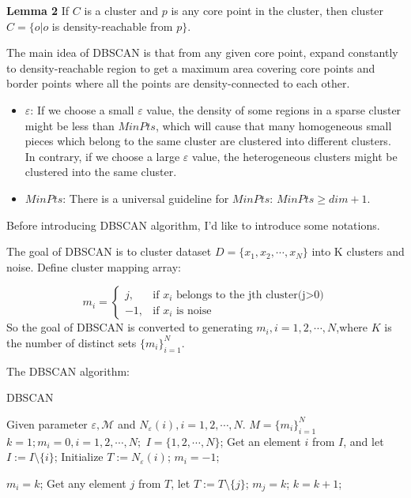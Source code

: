 \documentclass{article}
\begin{document}
\noindent\textbf{Lemma 2} If $C$ is a cluster and $p$ is any core point in the cluster, then cluster $C=\{o|o $ is density-reachable from $p \}$.


The main idea of DBSCAN is that from any given core point, expand constantly to density-reachable region to get a maximum area covering core points and border points where all the points are density-connected to each other.


\begin{itemize}
\item $\varepsilon$: If we choose a small $\varepsilon$ value, the density of some regions in a sparse cluster might be less than $MinPts$, which will cause that many homogeneous small pieces which belong to the same cluster are clustered into different clusters. In contrary, if we choose a large $\varepsilon$ value, the heterogeneous clusters might be clustered into the same cluster.
\item $MinPts$: There is a universal guideline for $MinPts$: $MinPts\geq dim+1$.
\end{itemize}


Before introducing DBSCAN algorithm, I'd like to introduce some notations. 


The goal of DBSCAN is to cluster dataset $D=\{x_1,x_2,\cdots,x_N\}$ into K clusters and noise. Define cluster mapping array:

$$
m_i=
\begin{cases}
         j,          & \text{if }x_i\text{ belongs to the jth cluster(j>0)}\\
         -1,         & \text{if }x_i\text{ is noise}
\end{cases}
$$
So the goal of DBSCAN is converted to generating $m_i,i=1,2,\cdots,N$,where $K$ is the number of distinct sets $\{m_i\}_{i=1}^N$.

The DBSCAN algorithm:
\begin{algorithm}
\caption{DBSCAN}\label{euclid}
\begin{algorithmic}[1]
\Require Given parameter $\varepsilon,\mathcal{M}$ and $N_\varepsilon(i),i=1,2,\cdots,N$.
\Ensure $M=\{m_i\}_{i=1}^N$
\State $k=1;m_i=0,i=1,2,\cdots,N;$
\State $I=\{1,2,\cdots,N\}$;
    \State Get an element $i$ from $I$, and let $I:=I\setminus\{i\}$;
        \State Initialize $T:=N_\varepsilon(i)$;
            \State $m_i=-1$;
        \Else{}
        
            \State $m_i=k$;
                \State Get any element $j$ from $T$, let $T:=T\setminus\{j\}$;
                    \State $m_j=k$;
                \EndIf 
                \EndIf 
            \EndWhile 
            \State $k=k+1$;
        \EndIf 
    \EndIf
\EndWhile

\end{algorithmic}
\end{algorithm}
\end{document}
